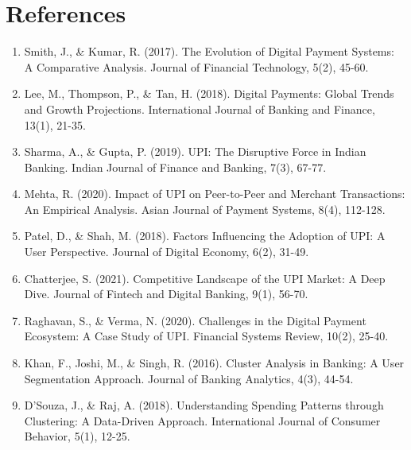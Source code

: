 \documentclass[12pt]{article}
\begin{document}
\section{References}

\begin{enumerate}
\item Smith, J., \& Kumar, R. (2017). The Evolution of Digital Payment Systems: A Comparative Analysis. Journal of Financial Technology, 5(2), 45-60.
\item Lee, M., Thompson, P., \& Tan, H. (2018). Digital Payments: Global Trends and Growth Projections. International Journal of Banking and Finance, 13(1), 21-35.
\item Sharma, A., \& Gupta, P. (2019). UPI: The Disruptive Force in Indian Banking. Indian Journal of Finance and Banking, 7(3), 67-77.
\item Mehta, R. (2020). Impact of UPI on Peer-to-Peer and Merchant Transactions: An Empirical Analysis. Asian Journal of Payment Systems, 8(4), 112-128.
\item Patel, D., \& Shah, M. (2018). Factors Influencing the Adoption of UPI: A User Perspective. Journal of Digital Economy, 6(2), 31-49.
\item Chatterjee, S. (2021). Competitive Landscape of the UPI Market: A Deep Dive. Journal of Fintech and Digital Banking, 9(1), 56-70.
\item Raghavan, S., \& Verma, N. (2020). Challenges in the Digital Payment Ecosystem: A Case Study of UPI. Financial Systems Review, 10(2), 25-40.
\item Khan, F., Joshi, M., \& Singh, R. (2016). Cluster Analysis in Banking: A User Segmentation Approach. Journal of Banking Analytics, 4(3), 44-54.
\item D'Souza, J., \& Raj, A. (2018). Understanding Spending Patterns through Clustering: A Data-Driven Approach. International Journal of Consumer Behavior, 5(1), 12-25.
\end{enumerate}
\end{document}
